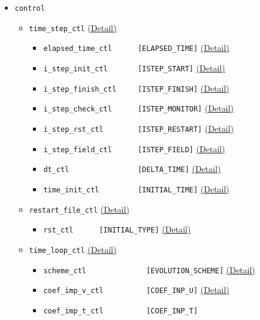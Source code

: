 \begin{itemize}
\begin{itemize}
\begin{itemize}
\begin{itemize}
			\end{itemize}
%
		\end{itemize}
%
	\end{itemize}
%
\item \verb|control|
	\begin{itemize}
	\item \verb|time_step_ctl|
		\label{href_i:time_step_ctl}
    		\hyperref[href_t:time_step_ctl]{(Detail)}
		\begin{itemize}
		\item \verb|elapsed_time_ctl      [ELAPSED_TIME]|
	    		\hyperref[href_t:elapsed_time_ctl]{(Detail)}
		\item \verb|i_step_init_ctl       [ISTEP_START]|
	    		\hyperref[href_t:i_step_init_ctl]{(Detail)}
		\item \verb|i_step_finish_ctl     [ISTEP_FINISH]|
	    		\hyperref[href_t:i_step_finish_ctl]{(Detail)}
		\item \verb|i_step_check_ctl      [ISTEP_MONITOR]|
	    		\hyperref[href_t:i_step_check_ctl]{(Detail)}
		\item \verb|i_step_rst_ctl        [ISTEP_RESTART]|
	    		\hyperref[href_t:i_step_rst_ctl]{(Detail)}
		\item \verb|i_step_field_ctl      [ISTEP_FIELD]|
	    		\hyperref[href_t:i_step_field_ctl]{(Detail)}
		\item \verb|dt_ctl                [DELTA_TIME]|
	    		\hyperref[href_t:dt_ctl]{(Detail)}
		\item \verb|time_init_ctl         [INITIAL_TIME]|
	    		\hyperref[href_t:time_init_ctl]{(Detail)}
		\end{itemize}
%
	\item \verb|restart_file_ctl|
		\label{href_i:restart_file_ctl}
    		\hyperref[href_t:restart_file_ctl]{(Detail)}
		\begin{itemize}
		\item \verb|rst_ctl      [INITIAL_TYPE]|
	    		\hyperref[href_t:rst_ctl]{(Detail)}
		\end{itemize}
%
	\item \verb|time_loop_ctl|
		\label{href_i:time_loop_ctl}
    		\hyperref[href_t:time_loop_ctl]{(Detail)}
		\begin{itemize}
		\item \verb|scheme_ctl              [EVOLUTION_SCHEME]|
	    		\hyperref[href_t:scheme_ctl]{(Detail)}
		\item \verb|coef_imp_v_ctl          [COEF_INP_U]|
	    		\hyperref[href_t:coef_imp_v_ctl]{(Detail)}
		\item \verb|coef_imp_t_ctl          [COEF_INP_T]|

\end{itemize}
\end{itemize}
\end{itemize}
